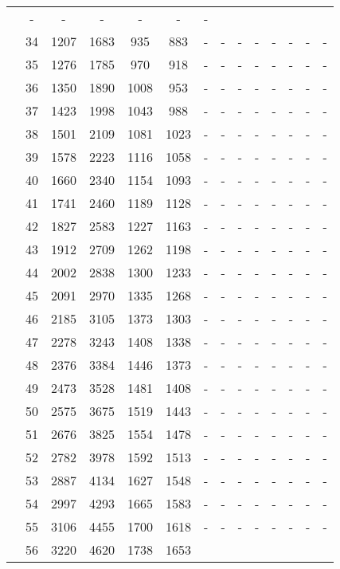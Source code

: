 \begin{table}[htb]
{\begin{tabular}{|c|c|c|c|c|c|c|c|c|c|c|c|c|c|}
 & - & -
 & - & -
 & - & -
 \\
 & 
34 & 1207 & 1683 & 935 & 883
 & - & -
 & - & -
 & - & -
 & - & -
 \\
 & 
35 & 1276 & 1785 & 970 & 918
 & - & -
 & - & -
 & - & -
 & - & -
 \\
 & 
36 & 1350 & 1890 & 1008 & 953
 & - & -
 & - & -
 & - & -
 & - & -
 \\
 & 
37 & 1423 & 1998 & 1043 & 988
 & - & -
 & - & -
 & - & -
 & - & -
 \\
 & 
38 & 1501 & 2109 & 1081 & 1023
 & - & -
 & - & -
 & - & -
 & - & -
 \\
 & 
39 & 1578 & 2223 & 1116 & 1058
 & - & -
 & - & -
 & - & -
 & - & -
 \\
 & 
40 & 1660 & 2340 & 1154 & 1093
 & - & -
 & - & -
 & - & -
 & - & -
 \\
 & 
41 & 1741 & 2460 & 1189 & 1128
 & - & -
 & - & -
 & - & -
 & - & -
 \\
 & 
42 & 1827 & 2583 & 1227 & 1163
 & - & -
 & - & -
 & - & -
 & - & -
 \\
 & 
43 & 1912 & 2709 & 1262 & 1198
 & - & -
 & - & -
 & - & -
 & - & -
 \\
 & 
44 & 2002 & 2838 & 1300 & 1233
 & - & -
 & - & -
 & - & -
 & - & -
 \\
 & 
45 & 2091 & 2970 & 1335 & 1268
 & - & -
 & - & -
 & - & -
 & - & -
 \\
 & 
46 & 2185 & 3105 & 1373 & 1303
 & - & -
 & - & -
 & - & -
 & - & -
 \\
 & 
47 & 2278 & 3243 & 1408 & 1338
 & - & -
 & - & -
 & - & -
 & - & -
 \\
 & 
48 & 2376 & 3384 & 1446 & 1373
 & - & -
 & - & -
 & - & -
 & - & -
 \\
 & 
49 & 2473 & 3528 & 1481 & 1408
 & - & -
 & - & -
 & - & -
 & - & -
 \\
 & 
50 & 2575 & 3675 & 1519 & 1443
 & - & -
 & - & -
 & - & -
 & - & -
 \\
 & 
51 & 2676 & 3825 & 1554 & 1478
 & - & -
 & - & -
 & - & -
 & - & -
 \\
 & 
52 & 2782 & 3978 & 1592 & 1513
 & - & -
 & - & -
 & - & -
 & - & -
 \\
 & 
53 & 2887 & 4134 & 1627 & 1548
 & - & -
 & - & -
 & - & -
 & - & -
 \\
 & 
54 & 2997 & 4293 & 1665 & 1583
 & - & -
 & - & -
 & - & -
 & - & -
 \\
 & 
55 & 3106 & 4455 & 1700 & 1618
 & - & -
 & - & -
 & - & -
 & - & -
 \\
 & 
56 & 3220 & 4620 & 1738 & 1653

\end{tabular}}
\end{table}
